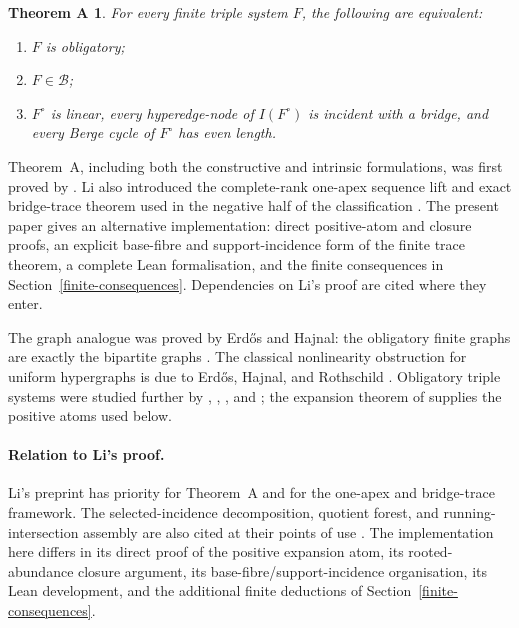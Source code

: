 \documentclass[a4paper,11pt,reqno]{amsart}
\theoremstyle{plain}
\newtheorem*{theoremA}{Theorem A}
\theoremstyle{definition}
\theoremstyle{remark}
\begin{document}
\begin{theoremA}\label{theorem-a-exact-characterisation}
For every finite triple system $F$, the following are equivalent:
\begin{enumerate}
\item $F$ is obligatory;
\item $F\in\mathcal B$;
\item $F^\circ$ is linear, every hyperedge-node of $I(F^\circ)$ is incident
with a bridge, and every Berge cycle of $F^\circ$ has even length.
\end{enumerate}
\end{theoremA}

Theorem~A, including both the constructive and intrinsic formulations, was
first proved by \citet[Theorem~1.1]{li2026}.  Li also introduced the
complete-rank one-apex sequence lift and exact bridge-trace theorem used in the
negative half of the classification
\citep[Sections~3--4 and Theorem~4.6]{li2026}.  The present paper gives an
alternative implementation: direct positive-atom and closure proofs, an
explicit base-fibre and support-incidence form of the finite trace theorem, a
complete Lean formalisation, and the finite consequences in
Section~\ref{finite-consequences}.  Dependencies on Li's proof are cited where
they enter.

The graph analogue was proved by Erdős and Hajnal: the obligatory finite
graphs are exactly the bipartite graphs
\citep[Corollary~5.6 and Theorem~7.4]{erdoshajnal1966}.  The classical
nonlinearity obstruction for uniform hypergraphs is due to Erdős, Hajnal,
and Rothschild \citep[Theorem~2, p.~532]{ehr1973}.  Obligatory triple
systems were studied further by \citet{egh1975}, \citet{komjath2001},
\citet{hajnalkomjath2008}, and \citet{komjath2008}; the expansion theorem of
\citet[Theorem~1.2]{reiher2024} supplies the positive atoms used below.

\paragraph{Relation to Li's proof.}
Li's preprint has priority for Theorem~A and for the one-apex and bridge-trace
framework.  The selected-incidence decomposition, quotient forest, and
running-intersection assembly are also cited at their points of use
\citep[Sections~3--5]{li2026}.  The implementation here differs in its direct
proof of the positive expansion atom, its rooted-abundance closure argument,
its base-fibre/support-incidence organisation, its Lean development, and the
additional finite deductions of Section~\ref{finite-consequences}.
\end{document}
